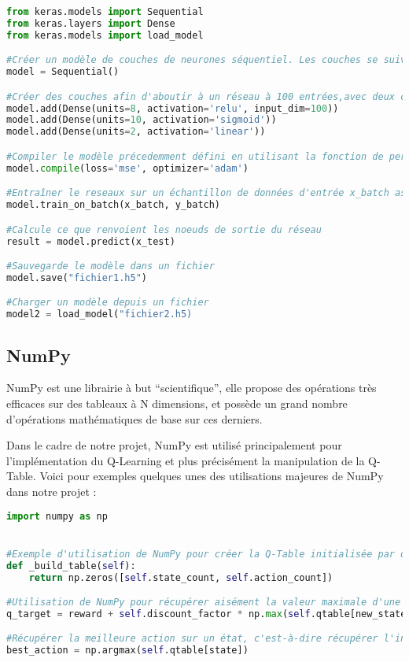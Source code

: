 \begin{lstlisting}[language=Python,breaklines=true, caption=Exemple d'utilisation de Keras]
from keras.models import Sequential
from keras.layers import Dense
from keras.models import load_model

#Créer un modèle de couches de neurones séquentiel. Les couches se suivent les unes les autres linéairement
model = Sequential()

#Créer des couches afin d'aboutir à un réseau à 100 entrées,avec deux couches cachées contenant respectivement 8 neurones à activation ReLU et 10 neurones a activation sigmoide, et 2 neurones de sortie à activation linéaire
model.add(Dense(units=8, activation='relu', input_dim=100))
model.add(Dense(units=10, activation='sigmoid'))
model.add(Dense(units=2, activation='linear'))

#Compiler le modèle précedemment défini en utilisant la fonction de perte  Mean Squared Error (Erreur quadratique moyenne) et l'optimizer Adam
model.compile(loss='mse', optimizer='adam')

#Entraîner le reseaux sur un échantillon de données d'entrée x_batch associées à l'échantillon de sorties attendues y_batch
model.train_on_batch(x_batch, y_batch)

#Calcule ce que renvoient les noeuds de sortie du réseau
result = model.predict(x_test)

#Sauvegarde le modèle dans un fichier
model.save("fichier1.h5")

#Charger un modèle depuis un fichier
model2 = load_model("fichier2.h5)

\end{lstlisting}

\subsection{NumPy}
NumPy est une librairie à but ``scientifique'', elle propose des opérations très efficaces sur des tableaux à N dimensions, et possède un grand nombre d'opérations mathématiques de base sur ces derniers.
\par
Dans le cadre de notre projet, NumPy est utilisé principalement pour l'implémentation du Q-Learning et plus précisément la manipulation de la Q-Table. Voici pour exemples quelques unes des utilisations majeures de NumPy dans notre projet :

\begin{lstlisting}[language=Python, breaklines=true, caption=Exemples d'utilisations de NumPy]
import numpy as np


#Exemple d'utilisation de NumPy pour créer la Q-Table initialisée par des 0.
def _build_table(self):
    return np.zeros([self.state_count, self.action_count])

#Utilisation de NumPy pour récupérer aisément la valeur maximale d'une ligne donnée
q_target = reward + self.discount_factor * np.max(self.qtable[new_state])

#Récupérer la meilleure action sur un état, c'est-à-dire récupérer l'indice de la case de valeur la plus importante
best_action = np.argmax(self.qtable[state])
\end{lstlisting}


